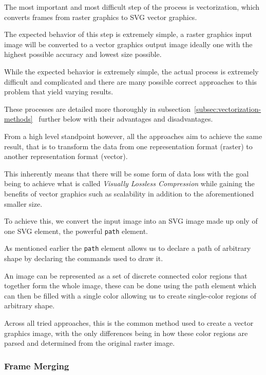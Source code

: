 \documentclass[12pt]{article}
\newcommand{\sentence}{} %
\newcommand{\italic}[1]{\textit{#1}}
\newcommand{\code}[1]{\texttt{#1}}
\newcommand{\fullref}[1]{\ref{#1}~\nameref{#1}}
\begin{document}
    \tab
    The most important and most difficult step of the process is vectorization, which converts
    frames from raster graphics to SVG vector graphics.
    \sentence
    The expected behavior of this step is extremely simple, a raster graphics input image will be converted to a
    vector graphics output image ideally one with the highest possible accuracy and lowest size possible.
    \sentence
    While the expected behavior is extremely simple, the actual process is extremely difficult and complicated and
    there are many possible correct approaches to this problem that yield varying results.
    \sentence
    These processes are detailed more thoroughly in subsection~\fullref{subsec:vectorization-methods} further below
    with their advantages and disadvantages.
    \sentence
    From a high level standpoint however, all the approaches aim to achieve the same result, that is to transform the
    data from one representation format (raster) to another representation format (vector).
    \sentence
    This inherently means that there will be some form of data loss with the goal being to achieve what is called
    \italic{Visually Lossless Compression} while gaining the benefits of vector graphics such as scalability in
    addition to the aforementioned smaller size.
    \sentence
    To achieve this, we convert the input image into an SVG image made up only of one SVG element, the powerful
    \code{path} element.
    \sentence
    As mentioned earlier the \code{path} element allows us to declare a path of arbitrary shape by declaring the
    commands used to draw it.
    \sentence
    An image can be represented as a set of discrete connected color regions that together form the whole image,
    these can be done using the path element which can then be filled with a single color allowing us to create
    single-color regions of arbitrary shape.
    \sentence
    Across all tried approaches, this is the common method used to create a vector graphics image, with the only
    differences being in how these color regions are parsed and determined from the original raster image.

    \subsubsection{Frame Merging}\label{subsubsec:frame-merging}
\end{document}
